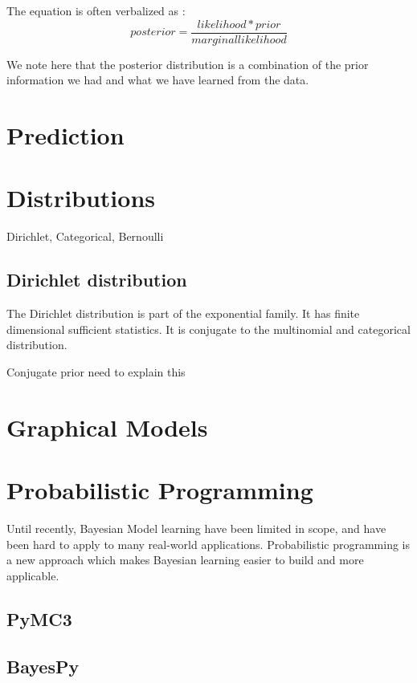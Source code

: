 \documentclass[11pt]{report}
\begin{document}
The equation is often verbalized as :
\begin{equation}
	posterior = \frac{likelihood * prior}{marginal likelihood}
\end{equation}

We note here that the posterior distribution is a combination of the prior information we had and what we have learned from the data. 




\section{Prediction}

\section{Distributions }

Dirichlet, Categorical, Bernoulli 
\subsection*{Dirichlet distribution}
The Dirichlet distribution is part of the exponential family. It has finite dimensional sufficient statistics. It is conjugate to the multinomial and categorical distribution. 

Conjugate prior  need to explain this 

\section{Graphical Models}

\section{Probabilistic Programming}

Until recently, Bayesian Model learning have been limited in scope, and have been hard to apply to many real-world applications. Probabilistic programming is a new approach which makes Bayesian learning easier to build and more applicable. 
\subsection{PyMC3}

\subsection{BayesPy}
\end{document}
